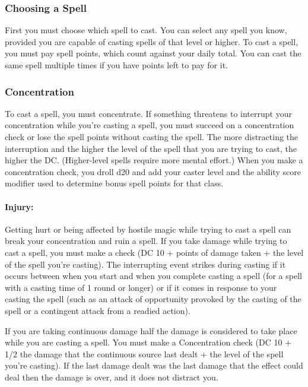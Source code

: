 \documentclass[../VancianToPsionics.tex]{subfiles}
\begin{document}
\subsubsection{Choosing a Spell}
First you must choose which spell to cast. You can select any spell you know, provided you are capable of casting spells of that level or higher. To cast a spell, you must pay spell points, which count against your daily total. You can cast the same spell multiple times if you have points left to pay for it.

\subsubsection{Concentration}
\label{sec:Concentration}
To cast a spell, you must concentrate. If something threatens to interrupt your concentration while you're casting a spell, you must succeed on a concentration check or lose the spell points without casting the spell. The more distracting the interruption and the higher the level of the spell that you are trying to cast, the higher the DC. (Higher-level spells require more mental effort.) When you make a concentration check, you droll d20 and add your caster level and the ability score modifier used to determine bonus spell points for that class.

\paragraph{Injury:} Getting hurt or being affected by hostile magic while trying to cast a spell can break your concentration and ruin a spell. If you take damage while trying to cast a spell, you must make a  check (DC 10 + points of damage taken + the level of the spell you're casting). The interrupting event strikes during casting if it occurs between when you start and when you complete casting a spell (for a spell with a casting time of 1 round or longer) or if it comes in response to your casting the spell (such as an attack of opportunity provoked by the casting of the spell or a contingent attack from a readied action). 

If you are taking continuous damage half the damage is considered to take place while you are casting a spell. You must make a Concentration check (DC 10 + 1/2 the damage that the continuous source last dealt + the level of the spell you're casting). If the last damage dealt was the last damage that the effect could deal then the damage is over, and it does not distract you.
\end{document}
